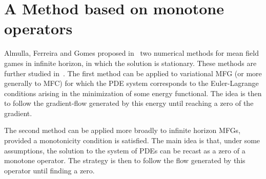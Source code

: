 \documentclass{amsproc}
\theoremstyle{definition}
\theoremstyle{remark}
\numberwithin{equation}{section}
\begin{document}
\clearpage


\section{\bf A Method based on monotone operators}
\label{AMS-num-sec:monotone-op}


Almulla, Ferreira and Gomes proposed in~\cite{MR3698446} two numerical methods for mean field games in infinite  horizon, in which the solution is stationary.
 These methods are further studied in~\cite{GomesSaude2018,GomesYang2018hessian}. The first method can be applied to variational MFG (or more generally to MFC) for which the PDE system corresponds to 
the Euler-Lagrange conditions arising  in the minimization of some energy functional.
 The idea is then to follow the gradient-flow generated by this energy until reaching a zero of the gradient.


 The second method can be applied more broadly to infinite horizon MFGs, provided a  monotonicity condition is satisfied.
 The main idea is that, under some assumptions, the solution to the system of PDEs can be recast as a zero of a monotone operator.
 The strategy is then to follow the flow generated by this operator until finding a zero.
\end{document}
